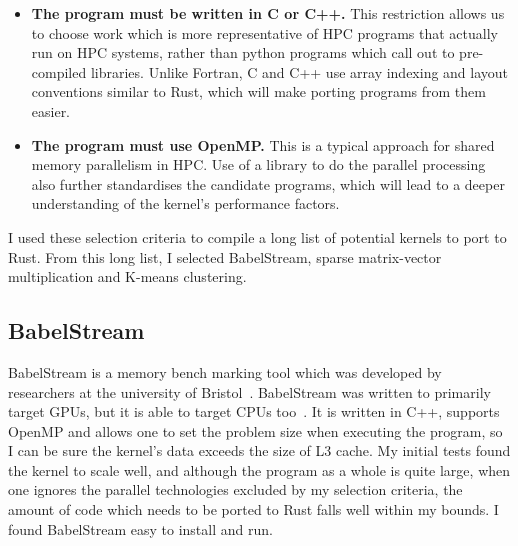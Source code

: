 \begin{itemize}
  \item \textbf{The program must be written in C or C++.} This restriction allows us to choose work which is more representative of HPC programs that actually run on HPC systems, rather than python programs which call out to pre-compiled libraries. Unlike Fortran, C and C++ use array indexing and layout conventions similar to Rust, which will make porting programs from them easier.

  \item \textbf{The program must use OpenMP.} This is a typical approach for shared memory parallelism in HPC\@. Use of a library to do the parallel processing also further standardises the candidate programs, which will lead to a deeper understanding of the kernel's performance factors.
\end{itemize}

I used these selection criteria to compile a long list of potential kernels to port to Rust. From this long list, I selected BabelStream, sparse matrix-vector multiplication and K-means clustering.

\subsection{BabelStream}

BabelStream is a memory bench marking tool which was developed by researchers at the university of Bristol~\cite{Babel2018}. BabelStream was written to primarily target GPUs, but it is able to target CPUs too~\cite{BabelStream}.
It is written in C++, supports OpenMP and allows one to set the problem size when executing the program, so I can be sure the kernel's data exceeds the size of L3 cache. My initial tests found the kernel to scale well, and although the program as a whole is quite large, when one ignores the parallel technologies excluded by my selection criteria, the amount of code which needs to be ported to Rust falls well within my bounds. I found BabelStream easy to install and run.

